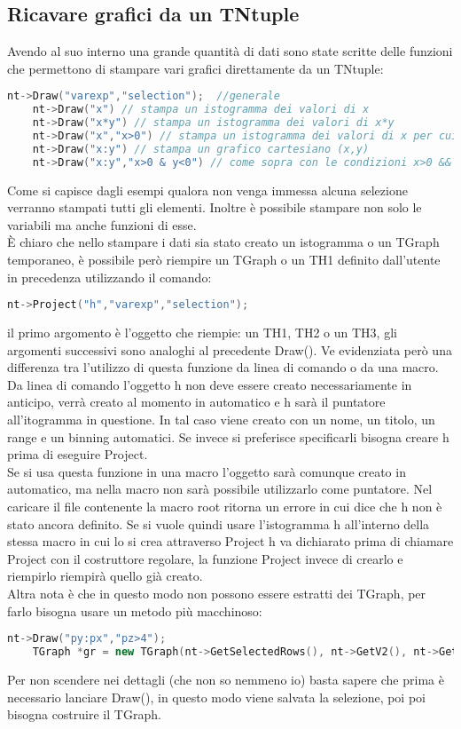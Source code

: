 \subsection{Ricavare grafici da un TNtuple}
Avendo al suo interno una grande quantità di dati sono state scritte delle funzioni che permettono di stampare vari grafici direttamente da un TNtuple:
\begin{lstlisting}[language=C++,label={cod1},mathescape=true,breaklines=true]
	nt->Draw("varexp","selection");  //generale
	nt->Draw("x") // stampa un istogramma dei valori di x
	nt->Draw("x*y") // stampa un istogramma dei valori di x*y
	nt->Draw("x","x>0") // stampa un istogramma dei valori di x per cui x>0
	nt->Draw("x:y") // stampa un grafico cartesiano (x,y)
	nt->Draw("x:y","x>0 & y<0") // come sopra con le condizioni x>0 && y<0
\end{lstlisting}
Come si capisce dagli esempi qualora non venga immessa alcuna selezione verranno stampati tutti gli elementi. Inoltre è possibile stampare non solo le variabili ma anche funzioni di esse.\\
È chiaro che nello stampare i dati sia stato creato un istogramma o un TGraph temporaneo, è possibile però riempire un TGraph o un TH1 definito dall'utente in precedenza utilizzando il comando:
\begin{lstlisting}[language=C++,label={cod1},mathescape=true,breaklines=true]
	nt->Project("h","varexp","selection");
\end{lstlisting}
il primo argomento è l'oggetto che riempie: un TH1, TH2 o un TH3, gli argomenti successivi sono analoghi al precedente Draw(). Ve evidenziata però una differenza tra l'utilizzo di questa funzione da linea di comando o da una macro. Da linea di comando l'oggetto h non deve essere creato necessariamente in anticipo, verrà creato al momento in automatico e h sarà il puntatore all'itogramma in questione. In tal caso viene creato con un nome, un titolo, un range e un binning automatici. Se invece si preferisce specificarli bisogna creare h prima di eseguire Project.\\
Se si usa questa funzione in una macro l'oggetto sarà comunque creato in automatico, ma nella macro non sarà possibile utilizzarlo come puntatore. Nel caricare il file contenente la macro root ritorna un errore in cui dice che h non è stato ancora definito. Se si vuole quindi usare l'istogramma h all'interno della stessa macro in cui lo si crea attraverso Project h va dichiarato prima di chiamare Project con il costruttore regolare, la funzione Project invece di crearlo e riempirlo riempirà quello già creato.\\
Altra nota è che in questo modo non possono essere estratti dei TGraph, per farlo bisogna usare un metodo più macchinoso:
\begin{lstlisting}[language=C++,label={cod1},mathescape=true,breaklines=true]
	nt->Draw("py:px","pz>4");
	TGraph *gr = new TGraph(nt->GetSelectedRows(), nt->GetV2(), nt->GetV1());
\end{lstlisting}
Per non scendere nei dettagli (che non so nemmeno io) basta sapere che prima è necessario lanciare Draw(), in questo modo viene salvata la selezione, poi poi bisogna costruire il TGraph.\\
